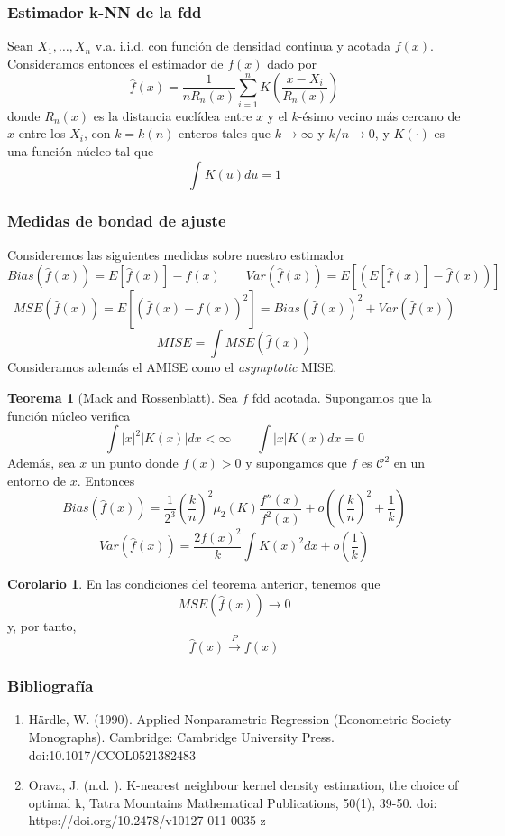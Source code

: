 \documentclass{beamer}
\theoremstyle{definition}
\newtheorem{teorema}{Teorema}
\newtheorem{coro}{Corolario}
\begin{document}
\begin{frame}
\frametitle{Estimador k-NN de la fdd}
Sean $X_1,\dotsc,X_n$ v.a. i.i.d. con función de densidad continua y acotada $f(x)$. Consideramos entonces el estimador de $f(x)$ dado por
$$
\hat{f}(x) = \frac{1}{nR_n(x)}\sum_{i=1}^n K\left(\frac{x-X_i}{R_n(x)}\right)
$$
donde $R_n(x)$ es la distancia euclídea entre $x$ y el $k$-ésimo vecino más cercano de $x$ entre los $X_i$, con $k=k(n)$  enteros tales que $k\to\infty$ y $k/n\to 0$, y $K(\cdot)$ es una función núcleo tal que 
$$
\int K(u)du=1
$$
\end{frame}


\begin{frame}
\frametitle{Medidas de bondad de ajuste}
Consideremos las siguientes medidas sobre nuestro estimador
$$
Bias(\hat{f}(x)) = E[\hat{f}(x)]-f(x) \qquad Var(\hat{f}(x)) = E\left[\left(E[\hat{f}(x)]-\hat{f}(x)\right)\right]
$$
$$
MSE(\hat{f}(x)) = E\left[(\hat{f}(x)-f(x))^2\right] = Bias(\hat{f}(x))^2 + Var(\hat{f}(x))
$$
$$
MISE = \int MSE(\hat{f}(x)) 
$$
Consideramos además el AMISE como el \textit{asymptotic} MISE.
\end{frame}


\begin{frame}
\begin{teorema}[Mack and Rossenblatt] Sea $f$ fdd acotada. Supongamos que la función núcleo verifica
$$
\int |x|^2 |K(x)|dx < \infty \qquad \int |x|K(x) dx = 0
$$
Además, sea $x$ un punto donde $f(x)>0$ y supongamos que $f$ es $\mathcal{C}^2$ en un entorno de $x$. Entonces
$$
Bias(\hat{f}(x)) = \frac{1}{2^3}\left(\frac{k}{n}\right)^2\mu_2(K)\frac{f''(x)}{f^2(x)}+o\left(\left(\frac{k}{n}\right)^2+\frac{1}{k}\right)
$$
$$
Var(\hat{f}(x)) = \frac{2f(x)^2}{k}\int K(x)^2 dx+o\left(\frac{1}{k}\right)
$$
\end{teorema}
\end{frame}



\begin{frame}
\begin{coro}
En las condiciones del teorema anterior, tenemos que
$$
MSE(\hat{f}(x))\to 0
$$
y, por tanto,
$$
\hat{f}(x)\overset{P}{\longrightarrow}f(x)
$$
\end{coro}
\end{frame}
\begin{frame}
\frametitle{Bibliografía}
\begin{enumerate}
\item Härdle, W. (1990). Applied Nonparametric Regression (Econometric Society Monographs). Cambridge: Cambridge University Press. doi:10.1017/CCOL0521382483
\item Orava, J. (n.d. ). K-nearest neighbour kernel density estimation, the choice of optimal k, Tatra Mountains Mathematical Publications, 50(1), 39-50. doi: https://doi.org/10.2478/v10127-011-0035-z
\end{enumerate}

\end{frame}
\end{document}
